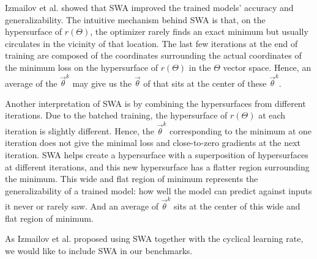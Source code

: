 Izmailov et al. \cite{izmailov_averaging_2019} showed that SWA improved the trained models' accuracy and generalizability.
The intuitive mechanism behind SWA is that, on the hypersurface of $r(\Theta)$, the optimizer rarely finds an exact minimum but usually circulates in the vicinity of that location.
The last few iterations at the end of training are composed of the coordinates surrounding the actual coordinates of the minimum loss on the hypersurface of $r(\Theta)$ in the $\Theta$ vector space.
Hence, an average of the $\vec{\theta}^k$ may give us the $\vec{\theta}$ of that sits at the center of these $\vec{\theta}^k$.

Another interpretation of SWA is by combining the hypersurfaces from different iterations.
Due to the batched training, the hypersurface of $r(\Theta)$ at each iteration is slightly different.
Hence, the $\vec{\theta}^k$ corresponding to the minimum at one iteration does not give the minimal loss and close-to-zero gradients at the next iteration.
SWA helps create a hypersurface with a superposition of hypersurfaces at different iterations, and this new hypersurface has a flatter region surrounding the minimum.
This wide and flat region of minimum represents the generalizability of a trained model: how well the model can predict against inputs it never or rarely saw.
And an average of $\vec{\theta}^k$ sits at the center of this wide and flat region of minimum.

As Izmailov et al. proposed using SWA together with the cyclical learning rate, we would like to include SWA in our benchmarks.